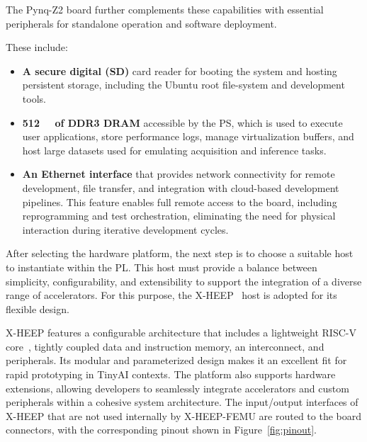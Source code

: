             The Pynq-Z2 board further complements these capabilities with essential peripherals for standalone operation and software deployment. 
            
            These include:

            \vspace{-1em}
            \begin{itemize}
                \item \textbf{A secure digital (SD)} card reader for booting the system and hosting persistent storage, including the Ubuntu root file-system and development tools.
                
                \item \textbf{\SI{512}{\mega\byte} of DDR3 DRAM} accessible by the PS, which is used to execute user applications, store performance logs, manage virtualization buffers, and host large datasets used for emulating acquisition and inference tasks.
                
                \item \textbf{An Ethernet interface} that provides network connectivity for remote development, file transfer, and integration with cloud-based development pipelines. This feature enables full remote access to the board, including reprogramming and test orchestration, eliminating the need for physical interaction during iterative development cycles.
            \end{itemize}
            
            After selecting the hardware platform, the next step is to choose a suitable host to instantiate within the PL. This host must provide a balance between simplicity, configurability, and extensibility to support the integration of a diverse range of accelerators. For this purpose, the \mbox{X-HEEP}~\cite{x-heep} host is adopted for its flexible design. 
            
            \mbox{X-HEEP} features a configurable architecture that includes a lightweight RISC-V core~\cite{zeroriscy}, tightly coupled data and instruction memory, an interconnect, and peripherals. Its modular and parameterized design makes it an excellent fit for rapid prototyping in TinyAI contexts. The platform also supports hardware extensions, allowing developers to seamlessly integrate accelerators and custom peripherals within a cohesive system architecture. The input/output interfaces of \mbox{X-HEEP} that are not used internally by \mbox{X-HEEP-FEMU} are routed to the board connectors, with the corresponding pinout shown in Figure~\ref{fig:pinout}.
            
